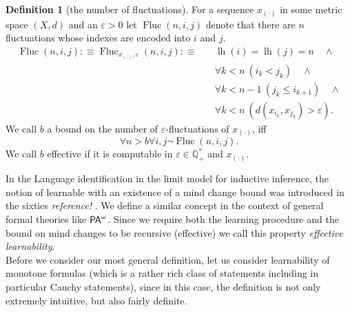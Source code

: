 \documentclass[1p]{elsarticle}
\newcommand{\usftext}[1]{\textsf{\upshape #1}}
\newcommand{\todo}[1]{{\it #1}
  \marginpar{\center\texttt{ToDo}}}    %
\DeclareMathOperator{\lh}{lh}  %
\DeclareMathOperator{\Fluc}{Fluc}
\newcommand{\QQ}{\ensuremath{\mathbb{Q}}}
\newcommand{\pa}{\ensuremath{{\usftext{PA}}^\omega}} %
\theoremstyle{plain}
\theoremstyle{definition}
\newtheorem{dfn}[thm]{Definition}
\theoremstyle{remark}
\renewcommand{\epsilon}{\varepsilon}
\theoremstyle{definition}
\begin{document}
\begin{dfn}[the number of fluctuations]
For a sequence $x_{(\cdot)}$ in some metric space $(X,d)$ and an $\epsilon>0$
let $\Fluc(n,i,j)$ denote that there are $n$ fluctuations whose indexes are encoded into $i$ and $j$.
\begin{align*}
\Fluc(n,i,j):\equiv\Fluc_{x_{(\cdot)},\epsilon}(n,i,j):\equiv\quad &\lh(i)=\lh(j)=n\quad \wedge\\ 
&\forall k<n\ (i_k<j_k) \quad \wedge\\
&\forall k<n-1\ (j_k\leq i_{k+1}) \quad \wedge\\
&\forall k<n\ (d(x_{i_k},x_{j_k})>\epsilon).
\end{align*}
We call $b$ a bound on the number of $\epsilon$-fluctuations of $x_{(\cdot)}$, iff 
\[
\forall n>b \forall i,j \neg\Fluc(n,i,j).
\]
We call $b$ effective if it is computable in $\epsilon\in\QQ^*_+$ and $x_{(\cdot)}$.
\end{dfn}



In the Language identification in the limit model for inductive inference, the notion of learnable with an existence of a mind change bound was introduced in the sixties \todo{reference!}. We define a similar concept in the context of general formal theories like $\pa$. Since we require both the learning procedure and the bound on mind changes to be recursive (effective) we call this property {\em effective learnability}.\\
Before we consider our most general definition, let us consider learnability of monotone formulas (which is a rather rich class of statements including in particular Cauchy statements), since in this case, the definition is not only extremely intuitive, but also fairly definite.
\end{document}
